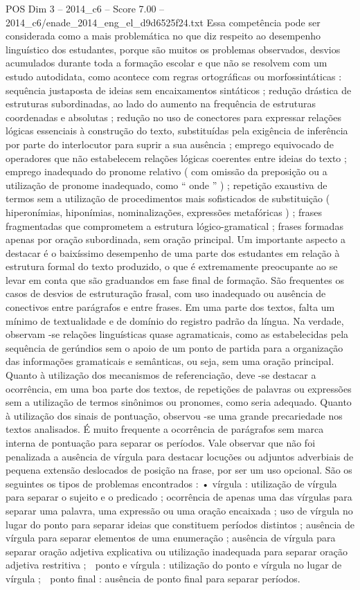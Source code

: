 \begin{textsample}{POS Dim 3 – 2014\_c6 – Score 7.00 – 2014\_c6/enade\_2014\_eng\_el\_d9d6525f24.txt}
Essa competência pode ser considerada como a mais problemática no que diz respeito ao desempenho linguístico dos estudantes, porque são muitos os problemas observados, desvios acumulados durante toda a formação escolar e que não se resolvem com um estudo autodidata, como acontece com regras ortográficas ou morfossintáticas : sequência justaposta de ideias sem encaixamentos sintáticos ; redução drástica de estruturas subordinadas, ao lado do aumento na frequência de estruturas coordenadas e absolutas ; redução no uso de conectores para expressar relações lógicas essenciais à construção do texto, substituídas pela exigência de inferência por parte do interlocutor para suprir a sua ausência ; emprego equivocado de operadores que não estabelecem relações lógicas coerentes entre ideias do texto ; emprego inadequado do pronome relativo ( com omissão da preposição ou a utilização de pronome inadequado, como “ onde ” ) ; repetição exaustiva de termos sem a utilização de procedimentos mais sofisticados de substituição ( hiperonímias, hiponímias, nominalizações, expressões metafóricas ) ; frases fragmentadas que comprometem a estrutura lógico-gramatical ; frases formadas apenas por oração subordinada, sem oração principal.
Um importante aspecto a destacar é o baixíssimo desempenho de uma parte dos estudantes em relação à estrutura formal do texto produzido, o que é extremamente preocupante ao se levar em conta que são graduandos em fase final de formação.
São frequentes os casos de desvios de estruturação frasal, com uso inadequado ou ausência de conectivos entre parágrafos e entre frases.
Em uma parte dos textos, falta um mínimo de textualidade e de domínio do registro padrão da língua.
Na verdade, observam -se relações linguísticas quase agramaticais, como as estabelecidas pela sequência de gerúndios sem o apoio de um ponto de partida para a organização das informações gramaticais e semânticas, ou seja, sem uma oração principal.
Quanto à utilização dos mecanismos de referenciação, deve -se destacar a ocorrência, em uma boa parte dos textos, de repetições de palavras ou expressões sem a utilização de termos sinônimos ou pronomes, como seria adequado.
Quanto à utilização dos sinais de pontuação, observou -se uma grande precariedade nos textos analisados.
É muito frequente a ocorrência de parágrafos sem marca interna de pontuação para separar os períodos.
Vale observar que não foi penalizada a ausência de vírgula para destacar locuções ou adjuntos adverbiais de pequena extensão deslocados de posição na frase, por ser um uso opcional.
São os seguintes os tipos de problemas encontrados : • vírgula : utilização de vírgula para separar o sujeito e o predicado ; ocorrência de apenas uma das vírgulas para separar uma palavra, uma expressão ou uma oração encaixada ; uso de vírgula no lugar do ponto para separar ideias que constituem períodos distintos ; ausência de vírgula para separar elementos de uma enumeração ; ausência de vírgula para separar oração adjetiva explicativa ou utilização inadequada para separar oração adjetiva restritiva ;  ponto e vírgula : utilização do ponto e vírgula no lugar de vírgula ;  ponto final : ausência de ponto final para separar períodos.

\end{textsample}
